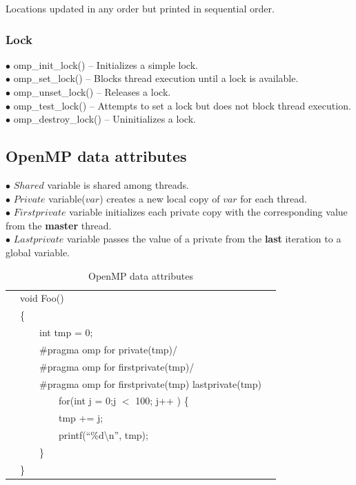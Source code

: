 \documentclass[twoside]{article}
\newcommand{\forceindent}{\leavevmode{\parindent=2em\indent}}
\newcounter{magicrownumbers}
\newcommand\rownumber{\stepcounter{magicrownumbers}\arabic{magicrownumbers}}
\begin{document}
Locations updated in any order but printed in sequential order.

\subsubsection{Lock}

\forceindent $\bullet$ omp\_init\_lock() -- Initializes a simple lock.\\
\forceindent $\bullet$ omp\_set\_lock() -- Blocks thread execution until a lock is available.\\
\forceindent $\bullet$ omp\_unset\_lock()  -- Releases a lock.\\
\forceindent $\bullet$ omp\_test\_lock()  -- Attempts to set a lock but does not block thread execution.\\
\forceindent $\bullet$ omp\_destroy\_lock() -- Uninitializes a lock.

\subsection{OpenMP data attributes}

\forceindent $\bullet$ $Shared$ variable is shared among threads.\\
\forceindent $\bullet$ $Private$ variable($var$) creates a new local copy of $var$ for each thread.\\
\forceindent $\bullet$ $Firstprivate$ variable initializes each private copy with the corresponding value from the \textbf{master} thread.\\
\forceindent $\bullet$ $Lastprivate$ variable passes the value of a private from the \textbf{last} iteration to a global variable.



\begin{table}[!ht]
    \centering
    \begin{tabular}{l  l  l }
    \hline
        \rownumber & void Foo() \\ 
        \rownumber & \{ \\ 
        \rownumber & \ \ \ \ int tmp = 0;  \\ 
        \rownumber & \ \ \ \ {\color{red}$\#$pragma omp for private(tmp)}/ \\
        \rownumber & \ \ \ \ {\color{red}$\#$pragma omp for firstprivate(tmp)}/ \\ 
        \rownumber & \ \ \ \ {\color{red}$\#$pragma omp for firstprivate(tmp) lastprivate(tmp)} \\ 
        \rownumber & \ \ \ \ \ \ \ \ for(int j = 0;j $<$ 100; j++ ) \{ \\ 
        \rownumber & \ \ \ \ \ \ \ \ tmp += j; \\ 
        \rownumber & \ \ \ \ \ \ \ \ printf(``\%d\textbackslash n'', tmp);  \\ 
        \rownumber & \ \ \ \ \} \\
        \rownumber & \} \\
        \hline
    \end{tabular}
    \caption*{OpenMP data attributes}
\end{table}
\setcounter{magicrownumbers}{0}
\end{document}
